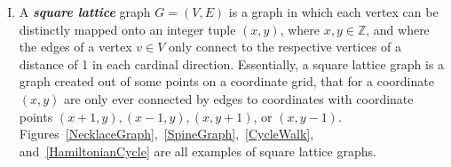 \begin{enumerate}[I.]
\item A \textit{\textbf{square lattice}} graph $G=(V,E)$ is a graph in which each vertex can be distinctly mapped onto an integer tuple $(x,y)$, where $x,y\in \mathbb{Z}$, and where the edges of a vertex $v\in V$ only connect to the respective vertices of a distance of 1 in each cardinal direction. Essentially, a square lattice graph is a graph created out of some points on a coordinate grid, that for a coordinate $(x,y)$ are only ever connected by edges to coordinates with coordinate points $(x+1,y), (x-1,y), (x,y+1)$, or $(x,y-1)$. Figures~\ref{NecklaceGraph},~\ref{SpineGraph},~\ref{CycleWalk}, and~\ref{HamiltonianCycle} are all examples of square lattice graphs.

\end{enumerate}